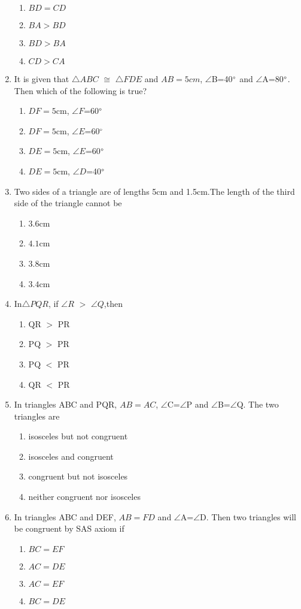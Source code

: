\documentclass{article}
\begin{document}
\begin{enumerate}
\begin{enumerate}
\item $BD=CD$
\item $BA>BD$
\item $BD>BA$
\item $CD>CA$
\end{enumerate}
\item It is given that $\triangle ABC$ $\cong$ $\triangle FDE$ and $AB=5cm$, $\angle$B=40$\degree$ and $\angle$A=80$\degree$. Then which of the following is true?
\begin{enumerate}
\item $DF=5$cm, $\angle F$=60$\degree$
\item $DF=5$cm, $\angle E$=60$\degree$
\item $DE=5$cm, $\angle E$=60$\degree$	
\item $DE=5$cm, $\angle D$=40$\degree$
\end{enumerate}		
\item Two sides of a triangle are of lengths 5cm and 1.5cm.The length of the third side of the triangle cannot be
\begin{enumerate}
\item $3.6$cm
\item $4.1$cm
\item $3.8$cm
\item $3.4$cm
\end{enumerate}
\item In$\triangle PQR$, if $\angle R$ $>$ $\angle Q$,then
\begin{enumerate}
\item QR $>$ PR
\item PQ $>$ PR
\item PQ $<$ PR
\item QR $<$ PR
\end{enumerate}
\item In triangles ABC and PQR, $AB=AC$, $\angle$C=$\angle$P and $\angle$B=$\angle$Q. The two triangles are
\begin{enumerate}
\item isosceles but not congruent	
\item isosceles and congruent
\item congruent but not isosceles
\item neither congruent nor isosceles
\end{enumerate}
\item In triangles ABC and DEF, $AB=FD$ and $\angle$A=$\angle$D. Then two triangles will be congruent by SAS axiom if
\begin{enumerate}
\item $BC=EF$
\item $AC=DE$
\item $AC=EF$
\item $BC=DE$
\end{enumerate}
\end{enumerate}
\end{document}
